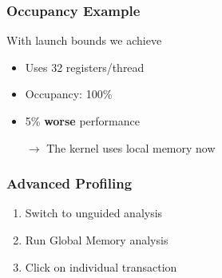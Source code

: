 \documentclass[aspectratio=169,handout]{beamer}
\begin{document}
\begin{frame}[fragile]
\frametitle{Occupancy Example}

\begin{minipage}{0.5\linewidth}
	With launch bounds we achieve
	\begin{itemize}
		\item Uses 32 registers/thread
		\item Occupancy: 100\%
		\item 5\% \textbf{worse} performance
		\item[$\rightarrow$] The kernel uses local memory now
	\end{itemize}
\end{minipage}
\begin{minipage}{0.47\linewidth}

\end{minipage}
\end{frame}


\begin{frame}[fragile]
\frametitle{Advanced Profiling}

	\begin{enumerate}
		\item Switch to unguided analysis
		\item Run Global Memory analysis
		\item Click on individual transaction
	\end{enumerate}
	
\end{frame}




\end{document}
